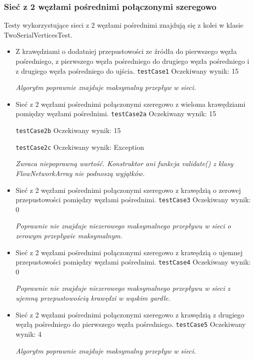 \subsubsection{Sieć z 2 węzłami pośrednimi połączonymi szeregowo}
Testy wykorzystujące sieci z 2 węzłami pośrednimi znajdują się z kolei w klasie
TwoSerialVerticesTest.
\begin{itemize}[nosep]
    \item Z krawędziami o dodatniej przepustowości ze źródła do pierwszego węzła
    pośredniego, z pierwszego węzła pośredniego do drugiego węzła pośredniego i z
    drugiego węzła pośredniego do ujścia.
    \texttt{testCase1}
    Oczekiwany wynik: 15

    \emph{Algorytm poprawnie znajduje maksymalny przepływ w sieci.}

    \item Sieć z 2 węzłami pośrednimi połączonymi szeregowo z wieloma
    krawędziami pomiędzy węzłami pośrednimi.
    \texttt{testCase2a}
    Oczekiwany wynik: 15

    \texttt{testCase2b}
    Oczekiwany wynik: 15

    \texttt{testCase2c}
    Oczekiwany wynik: Exception

    \emph{Zwraca niepoprawną wartość. Konstruktor ani funkcja validate() z klasy FlowNetworkArray nie podnoszą wyjątków.}

    \item Sieć z 2 węzłami pośrednimi połączonymi szeregowo z krawędzią o
    zerowej przepustowości pomiędzy węzłami pośrednimi.
    \texttt{testCase3}
    Oczekiwany wynik: 0

    \emph{Poprawnie nie znajduje niezerowego maksymalnego przepływu w sieci o zerowym przepływie maksymalnym.}

    \item Sieć z 2 węzłami pośrednimi połączonymi szeregowo z krawędzią o
    ujemnej przepustowości pomiędzy węzłami pośrednimi.
    \texttt{testCase4}
    Oczekiwany wynik: 0

    \emph{Poprawnie nie znajduje niezerowego maksymalnego przepływu w sieci z ujemną przepustowością krawędzi w wąskim gardle.}

    \item Sieć z 2 węzłami pośrednimi połączonymi szeregowo z krawędzią z
    drugiego węzłą pośredniego do pierwszego węzła pośredniego.
    \texttt{testCase5}
    Oczekiwany wynik: 4

    \emph{Algorytm poprawnie znajduje maksymalny przepływ w sieci.}


\end{itemize}
